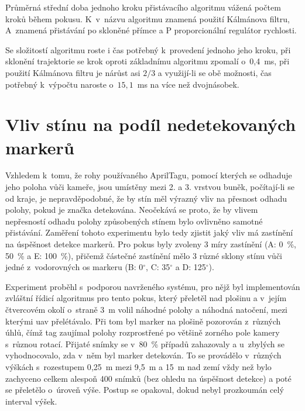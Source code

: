     \begin{table}
      \centering
      
      \caption[Průměrná střední doba jednoho kroku algoritmu]{Průměrná střední doba jednoho kroku přistávacího algoritmu vážená počtem kroků během pokusu. K~v~názvu algoritmu znamená použití Kálmánova filtru, A~znamená přistávání po skloněné přímce a P proporcionální regulátor rychlosti.}
      \label{tab:dobaKroku}
    \end{table}

    Se složitostí algoritmu roste i čas potřebný k~provedení jednoho jeho kroku, při sklonění trajektorie se krok oproti základnímu algoritmu zpomalí o~0{,}4~ms, při použití Kálmánova filtru je nárůst asi $2/3$ a využijí-li se obě možnosti, čas potřebný k~výpočtu naroste o~$15{,}1$~ms na více než dvojnásobek.
  \section{Vliv stínu na podíl nedetekovaných markerů} \label{sec:stin}
    Vzhledem k~tomu, že rohy používaného AprilTagu, pomocí kterých se odhaduje jeho poloha vůči kameře, jsou umístěny mezi 2. a 3. vrstvou buněk, počítají-li se od kraje, je nepravděpodobné, že by stín měl výrazný vliv na přesnost odhadu polohy, pokud je značka detekována. Neočekává se proto, že by vlivem nepřesností odhadu polohy způsobených stínem bylo ovlivněno samotné přistávání. Zaměření tohoto experimentu bylo tedy zjistit jaký vliv má zastínění na úspěšnost detekce markerů. Pro pokus byly zvoleny 3 míry zastínění (A: 0~\%, 50~\% a E: 100~\%), přičemž částečné zastínění mělo 3 různé sklony stínu vůči jedné z~vodorovných os markeru (B: 0$^\circ$, C: 35$^\circ$ a D: 125$^\circ$).

    Experiment proběhl s~podporou navrženého systému, pro nějž byl implementován zvláštní řídicí algoritmus pro tento pokus, který přeletěl nad plošinu a v~jejím čtvercovém okolí o~straně 3~m volil náhodné polohy a náhodná natočení, mezi kterými \acrshort{uav} přelétávalo. Při tom byl marker na plošině pozorován z~různých úhlů, čímž tag zaujímal polohy rozprostřené po většině zorného pole kamery s~různou rotací. Přijaté snímky se v~80~\% případů zahazovaly a u~zbylých se vyhodnocovalo, zda v~něm byl marker detekován. To se provádělo v~různých výškách s~rozestupem 0{,}25~m mezi 9{,}5~m a 15~m nad zemí vždy než bylo zachyceno celkem alespoň 400 snímků (bez ohledu na úspěšnost detekce) a poté se přeletělo o~úroveň výše. Postup se opakoval, dokud nebyl prozkoumán celý interval výšek. 

